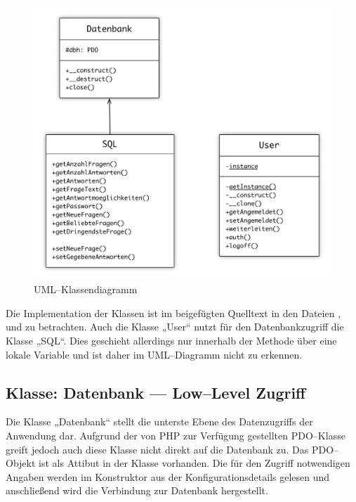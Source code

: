 \begin{figure}[H]
\begin{center}
\includegraphics[width=\textwidth]{UML.jpg}
\caption{UML--Klassendiagramm}
\end{center}
\label{fig:uml}
\end{figure}

Die Implementation der Klassen ist im beigefügten Quelltext in den Dateien ,  und  zu betrachten. Auch die Klasse „User“ nutzt für den Datenbankzugriff die Klasse „SQL“. Dies geschieht allerdings nur innerhalb der Methode  über eine lokale Variable und ist daher im UML--Diagramm nicht zu erkennen.

\subsection{Klasse: Datenbank --- Low--Level Zugriff}

Die Klasse „Datenbank“ stellt die unterste Ebene des Datenzugriffs der Anwendung dar. Aufgrund der von PHP zur Verfügung gestellten PDO--Klasse greift jedoch auch diese Klasse nicht direkt auf die Datenbank  zu. Das PDO--Objekt ist als Attibut in der Klasse vorhanden. Die für den Zugriff notwendigen Angaben werden im Konstruktor aus der Konfigurationsdetails gelesen und anschließend wird die Verbindung zur Datenbank hergestellt. 

